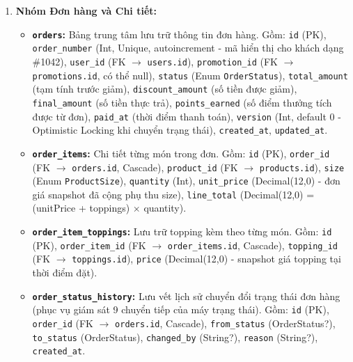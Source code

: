 \documentclass[12pt,a4paper,oneside]{report}
\begin{document}
\begin{enumerate}
    \item \textbf{Nhóm Đơn hàng và Chi tiết:}
    \begin{itemize}
        \item \textbf{\texttt{orders}:} Bảng trung tâm lưu trữ thông tin đơn hàng. Gồm: \texttt{id} (PK), \texttt{order\_number} (Int, Unique, autoincrement - mã hiển thị cho khách dạng \#1042), \texttt{user\_id} (FK \(\to\) \texttt{users.id}), \texttt{promotion\_id} (FK \(\to\) \texttt{promotions.id}, có thể null), \texttt{status} (Enum \texttt{OrderStatus}), \texttt{total\_amount} (tạm tính trước giảm), \texttt{discount\_amount} (số tiền được giảm), \texttt{final\_amount} (số tiền thực trả), \texttt{points\_earned} (số điểm thưởng tích được từ đơn), \texttt{paid\_at} (thời điểm thanh toán), \texttt{version} (Int, default 0 - Optimistic Locking khi chuyển trạng thái), \texttt{created\_at}, \texttt{updated\_at}.
        \item \textbf{\texttt{order\_items}:} Chi tiết từng món trong đơn. Gồm: \texttt{id} (PK), \texttt{order\_id} (FK \(\to\) \texttt{orders.id}, Cascade), \texttt{product\_id} (FK \(\to\) \texttt{products.id}), \texttt{size} (Enum \texttt{ProductSize}), \texttt{quantity} (Int), \texttt{unit\_price} (Decimal(12,0) - đơn giá snapshot đã cộng phụ thu size), \texttt{line\_total} (Decimal(12,0) = (unitPrice + toppings) \(\times\) quantity).
        \item \textbf{\texttt{order\_item\_toppings}:} Lưu trữ topping kèm theo từng món. Gồm: \texttt{id} (PK), \texttt{order\_item\_id} (FK \(\to\) \texttt{order\_items.id}, Cascade), \texttt{topping\_id} (FK \(\to\) \texttt{toppings.id}), \texttt{price} (Decimal(12,0) - snapshot giá topping tại thời điểm đặt).
        \item \textbf{\texttt{order\_}\allowbreak\texttt{status\_}\allowbreak\texttt{history}:} Lưu vết lịch sử chuyển đổi trạng thái đơn hàng (phục vụ giám sát 9 chuyển tiếp của máy trạng thái). Gồm: \texttt{id} (PK), \texttt{order\_id} (FK \(\to\) \texttt{orders.id}, Cascade), \texttt{from\_status} (OrderStatus?), \texttt{to\_status} (OrderStatus), \texttt{changed\_by} (String?), \texttt{reason} (String?), \texttt{created\_at}.
    \end{itemize}


\end{enumerate}
\end{document}
